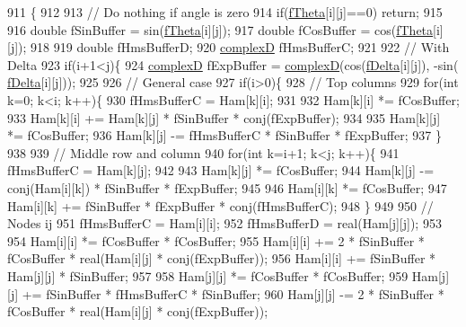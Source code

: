\begin{DoxyCode}
911                                                                         \{
912 
913   \textcolor{comment}{// Do nothing if angle is zero}
914   \textcolor{keywordflow}{if}(\hyperlink{classOscProb_1_1PMNS__Base_a1976887cd658dd86b2336c181f1470b4}{fTheta}[i][j]==0) \textcolor{keywordflow}{return};
915 
916   \textcolor{keywordtype}{double} fSinBuffer = sin(\hyperlink{classOscProb_1_1PMNS__Base_a1976887cd658dd86b2336c181f1470b4}{fTheta}[i][j]);
917   \textcolor{keywordtype}{double} fCosBuffer = cos(\hyperlink{classOscProb_1_1PMNS__Base_a1976887cd658dd86b2336c181f1470b4}{fTheta}[i][j]);
918 
919   \textcolor{keywordtype}{double}  fHmsBufferD;
920   \hyperlink{EigenPoint_8h_a67ca8e107e20610c3fff78d5e726ece0}{complexD} fHmsBufferC;
921 
922   \textcolor{comment}{// With Delta}
923   \textcolor{keywordflow}{if}(i+1<j)\{
924     \hyperlink{EigenPoint_8h_a67ca8e107e20610c3fff78d5e726ece0}{complexD} fExpBuffer = \hyperlink{EigenPoint_8h_a67ca8e107e20610c3fff78d5e726ece0}{complexD}(cos(\hyperlink{classOscProb_1_1PMNS__Base_ab2a5fa40e689b221c8a7d2c17213810d}{fDelta}[i][j]), -sin(
      \hyperlink{classOscProb_1_1PMNS__Base_ab2a5fa40e689b221c8a7d2c17213810d}{fDelta}[i][j]));
925 
926     \textcolor{comment}{// General case}
927     \textcolor{keywordflow}{if}(i>0)\{
928       \textcolor{comment}{// Top columns}
929       \textcolor{keywordflow}{for}(\textcolor{keywordtype}{int} k=0; k<i; k++)\{
930         fHmsBufferC = Ham[k][i];
931 
932         Ham[k][i] *= fCosBuffer;
933         Ham[k][i] += Ham[k][j] * fSinBuffer * conj(fExpBuffer);
934 
935         Ham[k][j] *= fCosBuffer;
936         Ham[k][j] -= fHmsBufferC * fSinBuffer * fExpBuffer;
937       \}
938 
939       \textcolor{comment}{// Middle row and column}
940       \textcolor{keywordflow}{for}(\textcolor{keywordtype}{int} k=i+1; k<j; k++)\{
941         fHmsBufferC = Ham[k][j];
942 
943         Ham[k][j] *= fCosBuffer;
944         Ham[k][j] -= conj(Ham[i][k]) * fSinBuffer * fExpBuffer;
945 
946         Ham[i][k] *= fCosBuffer;
947         Ham[i][k] += fSinBuffer * fExpBuffer * conj(fHmsBufferC);
948       \}
949 
950       \textcolor{comment}{// Nodes ij}
951       fHmsBufferC = Ham[i][i];
952       fHmsBufferD = real(Ham[j][j]);
953 
954       Ham[i][i] *= fCosBuffer * fCosBuffer;
955       Ham[i][i] += 2 * fSinBuffer * fCosBuffer * real(Ham[i][j] * conj(fExpBuffer));
956       Ham[i][i] += fSinBuffer * Ham[j][j] * fSinBuffer;
957 
958       Ham[j][j] *= fCosBuffer * fCosBuffer;
959       Ham[j][j] += fSinBuffer * fHmsBufferC * fSinBuffer;
960       Ham[j][j] -= 2 * fSinBuffer * fCosBuffer * real(Ham[i][j] * conj(fExpBuffer));

\end{DoxyCode}
